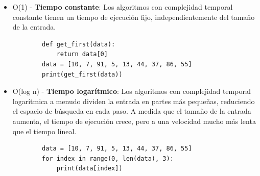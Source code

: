 \documentclass[xcolor=table]{beamer}
\begin{document}
\begin{frame} [fragile] \small  

\begin{itemize}
    \item O(1) - \textbf{Tiempo constante}: Los algoritmos con complejidad temporal constante tienen un tiempo de ejecución fijo, independientemente del tamaño de la entrada. 
    \begin{verbatim}
        def get_first(data):
            return data[0]
        data = [10, 7, 91, 5, 13, 44, 37, 86, 55]
        print(get_first(data))
    \end{verbatim}

     \item O(log n) - \textbf{Tiempo logarítmico}: Los algoritmos con complejidad temporal logarítmica a menudo dividen la entrada en partes más pequeñas, reduciendo el espacio de búsqueda en cada paso.  A medida que el tamaño de la entrada aumenta, el tiempo de ejecución crece, pero a una velocidad mucho más lenta que el tiempo lineal.
 
    \begin{verbatim}
        data = [10, 7, 91, 5, 13, 44, 37, 86, 55]
        for index in range(0, len(data), 3):
            print(data[index])
    \end{verbatim}
\end{itemize}

\end{frame} 
\end{document}

